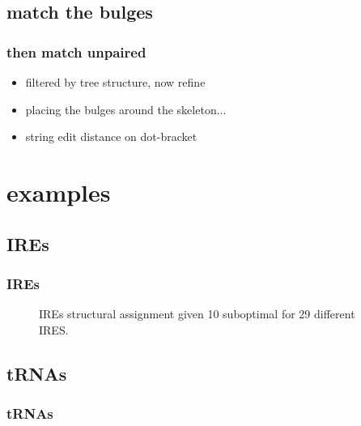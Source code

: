 \documentclass{beamer}
\begin{document}
\subsection{match the bulges}
\begin{frame}
	\frametitle{then match unpaired}
	\begin{figure}[!htb]
	\centering
	\resizebox{0.75\textwidth}{!}{}
	\end{figure}	
	\begin{itemize}
		\item filtered by tree structure, now refine
		\item placing the bulges around the skeleton...
		\item string edit distance on dot-bracket
	\end{itemize}
\end{frame}



\section{examples}
\subsection{IREs}
\begin{frame}
	\frametitle{IREs}
	\begin{figure}[!htb]
	\centering
	\resizebox{0.75\textwidth}{!}{}
	\caption{IREs structural assignment given 10 suboptimal for 29 different IRES.}
	\end{figure} 
\end{frame}



\subsection{tRNAs}
\begin{frame}
	\frametitle{tRNAs}
	

\end{frame}
\end{document}
